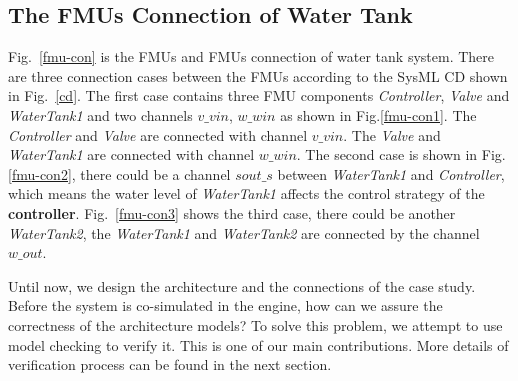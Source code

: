 \subsection{The FMUs Connection of Water Tank}
Fig.~\ref{fmu-con} is the FMUs and FMUs connection of water tank system. There are three connection cases between the FMUs according to the SysML CD shown in Fig.~\ref{cd}. The first case contains three FMU components \emph{Controller}, \emph{Valve} and \emph{WaterTank1} and two channels $v \_ vin$, $w \_ win$ as shown in Fig.\ref{fmu-con1}. The \emph{Controller} and \emph{Valve} are connected with channel $v \_ vin$. The \emph{Valve} and \emph{WaterTank1} are connected with channel $w \_ win$. The second case is shown in Fig.\ref{fmu-con2}, there could be a channel $sout \_ s$ between \emph{WaterTank1} and \emph{Controller}, which means the water level of \emph{WaterTank1} affects the control strategy of the \textbf{controller}. Fig.~\ref{fmu-con3} shows the third case, there could be another \emph{WaterTank2}, the \emph{WaterTank1} and \emph{WaterTank2} are connected by the channel $w \_ out$. 
\begin{figure}[htbp]
\end{figure}

Until now, we design the architecture and the connections of the case study. Before the system is co-simulated in the engine, how can we assure the correctness of the architecture models? To solve this problem, we attempt to use model checking to verify it. This is one of our main contributions. More details of verification process can be found in the next section.